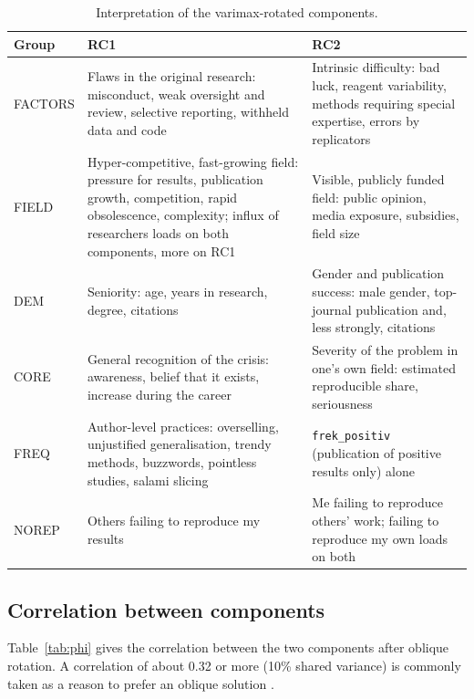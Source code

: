\documentclass[11pt,a4paper]{article}
\newcommand{\var}[1]{\texttt{#1}}
\begin{document}
\begin{table}[ht]
\centering
\small
\begin{tabular}{@{}l L{5.8cm} L{5.8cm}@{}}
\toprule
Group & RC1 & RC2\\
\midrule
FACTORS & Flaws in the original research: misconduct, weak oversight and review, selective reporting, withheld data and code & Intrinsic difficulty: bad luck, reagent variability, methods requiring special expertise, errors by replicators\\[4pt]
FIELD & Hyper-competitive, fast-growing field: pressure for results, publication growth, competition, rapid obsolescence, complexity; influx of researchers loads on both components, more on RC1 & Visible, publicly funded field: public opinion, media exposure, subsidies, field size\\[4pt]
DEM & Seniority: age, years in research, degree, citations & Gender and publication success: male gender, top-journal publication and, less strongly, citations\\[4pt]
CORE & General recognition of the crisis: awareness, belief that it exists, increase during the career & Severity of the problem in one's own field: estimated reproducible share, seriousness\\[4pt]
FREQ & Author-level practices: overselling, unjustified generalisation, trendy methods, buzzwords, pointless studies, salami slicing & \var{frek\_positiv} (publication of positive results only) alone\\[4pt]
NOREP & Others failing to reproduce my results & Me failing to reproduce others' work; failing to reproduce my own loads on both\\
\bottomrule
\end{tabular}
\caption{Interpretation of the varimax-rotated components.}
\label{tab:dims}
\end{table}

\subsection{Correlation between components}
\label{sec:phi}

Table~\ref{tab:phi} gives the correlation between the two components after oblique rotation. A correlation of about 0.32 or more (10\% shared variance) is commonly taken as a reason to prefer an oblique solution \citep{tabachnick2013}.
\end{document}
